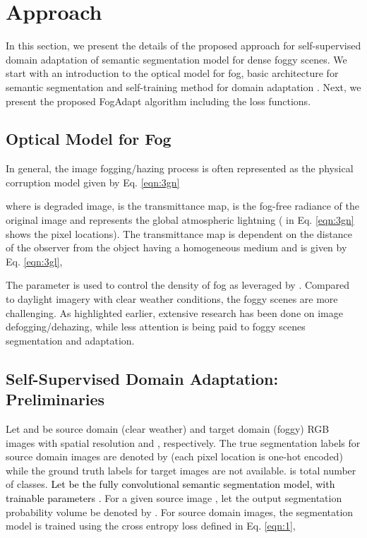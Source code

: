 \documentclass[final,5p,times,twocolumn]{elsarticle}
\begin{document}
\section{Approach}
\label{sec:method}
In this section, we present the details of the proposed approach for self-supervised domain adaptation of semantic segmentation model for dense foggy scenes. 
We start with an introduction to the optical model for fog, basic architecture for semantic segmentation \cite{wu2019Resnet38} and self-training method for domain adaptation \cite{zou2018unsupervised, mlsl2020}. 
Next, we present the proposed FogAdapt algorithm including the loss functions. 


\subsection{Optical Model for Fog}

In general, the image fogging/hazing process is often represented as the physical corruption model given by Eq. \ref{eqn:3gn} \cite{sakaridis2018semantic}

where  is degraded image,  is the transmittance map,  is the fog-free radiance of the original image and  represents the global atmospheric lightning ( in Eq. \ref{eqn:3gn} shows the pixel locations). The transmittance map  is dependent on the distance  of the observer from the object having a homogeneous medium and is given by Eq. \ref{eqn:3gl},

The parameter  is used to control the density of fog as leveraged by \cite{sakaridis2018semantic}. Compared to daylight imagery with clear weather conditions, the foggy scenes are more challenging. 
As highlighted earlier, extensive research has been done on image defogging/dehazing, while less attention is being paid to foggy scenes segmentation and adaptation.

\subsection{Self-Supervised Domain Adaptation: Preliminaries}

Let  and  be source domain (clear weather) and target domain (foggy) RGB images with spatial resolution  and , respectively. The true segmentation labels for source domain images are denoted by (each pixel location is one-hot encoded) while the ground truth labels for target images are not available. 
 is total number of classes. 
\textcolor{black}{Let  be the fully convolutional semantic segmentation model, with trainable parameters .
}
For a given source image , let the output segmentation probability volume be denoted by . 
For source domain images, the segmentation model is trained using the cross entropy loss defined in Eq. \ref{eqn:1},
\end{document}

